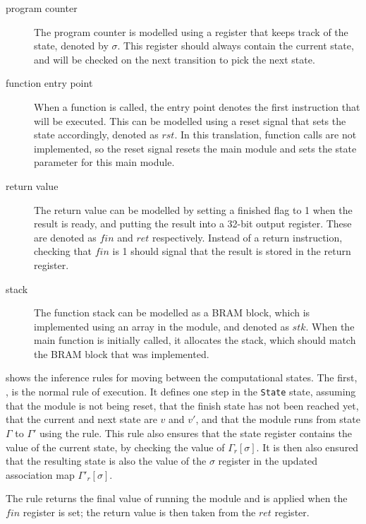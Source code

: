 \begin{description}
\item[program counter] The program counter is modelled using a register that
  keeps track of the state, denoted by $\sigma$.  This register should always
  contain the current state, and will be checked on the next transition to pick
  the next state.
\item[function entry point] When a function is called, the entry point denotes
  the first instruction that will be executed. This can be modelled using a
  reset signal that sets the state accordingly, denoted as $\mathit{rst}$.  In
  this translation, function calls are not implemented, so the reset signal
  resets the main module and sets the state parameter for this main module.
\item[return value] The return value can be modelled by setting a finished flag
  to 1 when the result is ready, and putting the result into a 32-bit output
  register. These are denoted as $\mathit{fin}$ and $\mathit{ret}$ respectively.
  Instead of a return instruction, checking that $\mathit{fin}$ is 1 should
  signal that the result is stored in the return register.
\item[stack] The function stack can be modelled as a \gls{BRAM} block, which is
  implemented using an array in the module, and denoted as $\mathit{stk}$.
  When the main function is initially called, it allocates the stack, which
  should match the \gls{BRAM} block that was implemented.
\end{description}

 shows the inference rules for moving between the
computational states.  The first, , is the normal rule
of execution.  It defines one step in the \texttt{State} state, assuming that
the module is not being reset, that the finish state has not been reached yet,
that the current and next state are $v$ and $v'$, and that the module runs from
state $\Gamma$ to $\Gamma'$ using the  rule.  This rule
also ensures that the state register contains the value of the current state, by
checking the value of $\Gamma_r[\sigma]$.  It is then also ensured that the
resulting state is also the value of the $\sigma$ register in the updated
association map  $\Gamma'_r[\sigma]$.

The  rule returns the final value of running the
module and is applied when the $\mathit{fin}$ register is set; the return value
is then taken from the $\mathit{ret}$ register.

